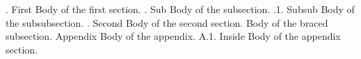 
\document
{}. First\endhead
Body of the first section.
. Sub\endsubhead
Body of the subsection.
.1. Subsub\endsubsubhead
Body of the subsubsection.
. Second\endhead
Body of the second section.
Body of the braced subsection.
\specialhead Appendix\endspecialhead
Body of the appendix.
\head A.1. Inside\endhead
Body of the appendix section.
\enddocument
